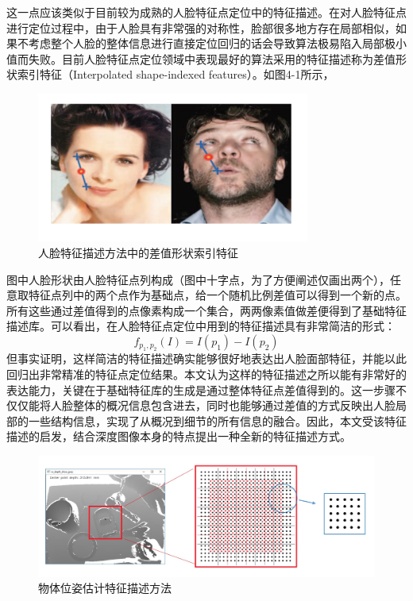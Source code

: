这一点应该类似于目前较为成熟的人脸特征点定位中的特征描述。在对人脸特征点进行定位过程中，由于人脸具有非常强的对称性，脸部很多地方存在局部相似，如果不考虑整个人脸的整体信息进行直接定位回归的话会导致算法极易陷入局部极小值而失败。目前人脸特征点定位领域中表现最好的算法采用的特征描述称为差值形状索引特征（Interpolated shape-indexed features）\cite{burgos2013robust}。如图4-1所示，
\begin{figure}[htb]
	\centering 
	\includegraphics[width=0.8\textwidth]{./mypic/人脸特征描述方法.jpg} 
	\caption{人脸特征描述方法中的差值形状索引特征} 
\end{figure}
图中人脸形状由人脸特征点列构成（图中十字点，为了方便阐述仅画出两个），任意取特征点列中的两个点作为基础点，给一个随机比例差值可以得到一个新的点。所有这些通过差值得到的点像素构成一个集合，两两像素值做差便得到了基础特征描述库。可以看出，在人脸特征点定位中用到的特征描述具有非常简洁的形式：
\begin{equation}
	f_{p_1,p_2}(I)=I(p_1)-I(p_2)
\end{equation}
但事实证明，这样简洁的特征描述确实能够很好地表达出人脸面部特征，并能以此回归出非常精准的特征点定位结果。本文认为这样的特征描述之所以能有非常好的表达能力，关键在于基础特征库的生成是通过整体特征点差值得到的。这一步骤不仅仅能将人脸整体的概况信息包含进去，同时也能够通过差值的方式反映出人脸局部的一些结构信息，实现了从概况到细节的所有信息的融合。因此，本文受该特征描述的启发，结合深度图像本身的特点提出一种全新的特征描述方式。
\begin{figure}[htb]
	\centering 
	\includegraphics[width=\textwidth]{./mypic/物体位姿估计特征描述方法.jpg} 
	\caption{物体位姿估计特征描述方法} 
\end{figure}

